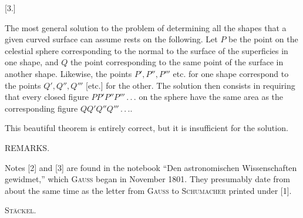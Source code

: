 %
\begin{center}[3.]\end{center}

The most general solution to the problem of determining all the shapes that a given curved surface can assume rests on the following. Let $P$ be the point on the celestial sphere corresponding to the normal to the surface of the superficies in one shape, and $Q$ the point corresponding to the same point of the surface in another shape. Likewise, the points $P',P'',P'''$ etc. for one shape correspond to the points $Q',Q'',Q'''$ [etc.] for the other. The solution then consists in requiring that every closed figure $PP'P''P'''\, .\, .\, .$ on the sphere have the same area as the corresponding figure $QQ'Q''Q'''\, .\, .\, .$.

 This beautiful theorem is entirely correct, but it is insufficient for the solution.

\begin{center}REMARKS.\end{center}

Notes [2] and [3] are found in the notebook “Den astronomischen Wissenschaften gewidmet,” which \textsc{Gauss} began in November 1801. They presumably date from about the same time as the letter from \textsc{Gauss} to \textsc{Schumacher} printed under [1].
\begin{flushright}\textsc{Stäckel}.\end{flushright}
